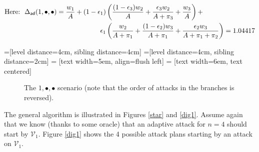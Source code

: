 \documentclass[11pt]{llncs}
\newcommand{\atk}{\begin{turn}{130}{\scriptsize \Lightning}\end{turn}}
\newcommand{\tk}{\raisebox{1ex}{\atk}}
\newcommand{\LL}[2]{\mbox{\tk $\mathcal{V}_{#1}$,~{\scriptsize \StopWatchEnd} #2}}
\begin{document}
\begin{alignat*}{10}
\mbox{Here:~~}\Delta_{\mbox{\scriptsize {\sf ad}}}(1,\bullet,\bullet)=\frac{w_1}A+(1-\epsilon_1) &\left(\frac{(1-\epsilon_3) w_2}A+\frac{\epsilon_3 w_2}{A+\pi_3}+\frac{w_3}{A}\right)+\\
            \epsilon_1 & \left(\frac{w_2}{A+\pi_1}+\frac{(1-\epsilon_2) w_3}{A+\pi_1}+\frac{\epsilon_2 w_3}{A+\pi_1+\pi_2}\right)=1.04417\\
\end{alignat*}

=[level distance=4cm, sibling distance=4cm]
=[level distance=4cm, sibling distance=2cm]
 = [text width=5em, align=flush left] %
 = [text width=6em, text centered] %

\begin{figure}[!h]
\begin{center}
\end{center}
\caption{The $1,\bullet,\bullet$ scenario (note that the order of attacks in the branches is reversed).}
\label{fut1}
\end{figure}


The general algorithm is illustrated in Figures \ref{star} and \ref{dig1}. Assume again that we know (thanks to some oracle) that an adaptive attack for $n=4$ should start by $\mathcal{V}_1$. Figure \ref{dig1} shows the 4 possible attack plans starting by an attack on $\mathcal{V}_1$.\smallskip
\end{document}
